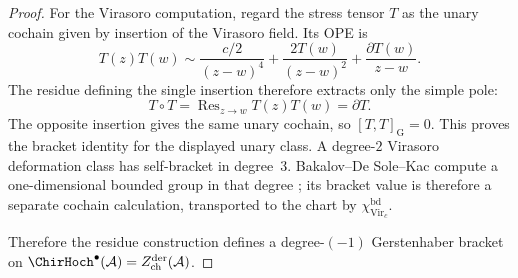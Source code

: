 \begin{proof}
For the Virasoro computation, regard the stress tensor $T$ as the unary
cochain given by insertion of the Virasoro field. Its OPE is
\[
T(z)T(w)
\sim
\frac{c/2}{(z-w)^4}
+
\frac{2T(w)}{(z-w)^2}
+
\frac{\partial T(w)}{z-w}.
\]
The residue defining the single insertion therefore extracts only
the simple pole:
\[
T \circ T
=
\operatorname{Res}_{z \to w} T(z)T(w)
=
\partial T.
\]
The opposite insertion gives the same unary cochain, so
$[T,T]_{\mathrm G}=0$.  This proves the bracket identity for the
displayed unary class.  A degree-$2$ Virasoro deformation class has
self-bracket in degree~$3$.  Bakalov--De Sole--Kac compute a
one-dimensional bounded group in that degree
\cite[Theorem~7.2]{BDSK21}; its bracket value is therefore a separate
cochain calculation, transported to the chart by
$\chi_{\operatorname{Vir}_c}^{\mathrm{bd}}$.

Therefore the residue construction defines a degree-$(-1)$
Gerstenhaber bracket on
$\ChirHoch^\bullet(\mathcal{A}) = Z^{\mathrm{der}}_{\mathrm{ch}}
(\mathcal{A})$.
\end{proof}

